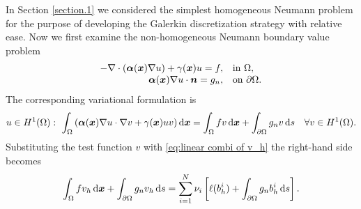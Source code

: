 	In Section \ref{section.1} we considered the simplest homogeneous Neumann 
	problem for the purpose of developing the Galerkin discretization strategy 
	with relative ease. Now we first examine the non-homogeneous Neumann 
	boundary value problem
	\begin{equation}
		\begin{array}{rl}
			-\nabla\cdot(\bm{\alpha}(\bm{x}) \nabla u)+
			\gamma(\bm{x})u=f, &\textrm{in }\Omega,\\
			\bm{\alpha}(\bm{x})\nabla{u}\cdot\bm{n}=g_n,
			&\textrm{on }\partial\Omega.
		\end{array}
	\end{equation}
	The corresponding variational formulation is 
	\begin{equation}
		u\in H^1(\Omega):\ 
		\int_{\Omega}\left(\bm{\alpha}(\bx)\nabla u\cdot\nabla v+
			\gamma(\bx)uv\right)\dx = 
		\int_{\Omega}fv\,\dx + \int_{\partial\Omega} g_n v\,\rd s 
		\quad\forall v\in H^1(\Omega).
	\end{equation}
	Substituting the test function $v$ with \eqref{eq:linear combi of v_h} the 
	right-hand side becomes
	\begin{equation}
		\int_{\Omega}fv_h\,\mathrm{d}\bm{x} + \int_{\partial\Omega} g_n v_h\,\mathrm{d} s =
		\sum_{i=1}^{N}\nu_i\left[\ell(b_h^i)+
		\int_{\partial\Omega}g_n b_h^i\,\mathrm{d} s \right].
	\end{equation}
	\vspace{-15pt}
